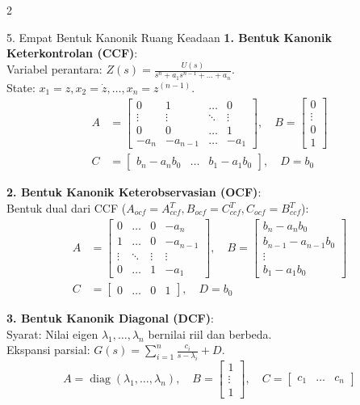 \documentclass[10pt,a4paper]{article}
\begin{document}
\begin{multicols*}{2}
\begin{rumusbox}{5. Empat Bentuk Kanonik Ruang Keadaan}
\textbf{1. Bentuk Kanonik Keterkontrolan (CCF)}:\\
Variabel perantara: $Z(s) = \frac{U(s)}{s^n + a_1 s^{n-1} + \dots + a_n}$.\\
State: $x_1 = z, x_2 = \dot{z}, \dots, x_n = z^{(n-1)}$.
{\scriptsize
\begin{align*}
A &= \begin{bmatrix} 0 & 1 & \dots & 0 \\ \vdots & \vdots & \ddots & \vdots \\ 0 & 0 & \dots & 1 \\ -a_n & -a_{n-1} & \dots & -a_1 \end{bmatrix}, \quad B = \begin{bmatrix} 0 \\ \vdots \\ 0 \\ 1 \end{bmatrix} \\
C &= \begin{bmatrix} b_n - a_n b_0 & \dots & b_1 - a_1 b_0 \end{bmatrix}, \quad D = b_0
\end{align*}
}

\textbf{2. Bentuk Kanonik Keterobservasian (OCF)}:\\
Bentuk dual dari CCF ($A_{ocf} = A_{ccf}^T, B_{ocf} = C_{ccf}^T, C_{ocf} = B_{ccf}^T$):
{\scriptsize
\begin{align*}
A &= \begin{bmatrix} 0 & \dots & 0 & -a_n \\ 1 & \dots & 0 & -a_{n-1} \\ \vdots & \ddots & \vdots & \vdots \\ 0 & \dots & 1 & -a_1 \end{bmatrix}, \quad B = \begin{bmatrix} b_n - a_n b_0 \\ b_{n-1} - a_{n-1} b_0 \\ \vdots \\ b_1 - a_1 b_0 \end{bmatrix} \\
C &= \begin{bmatrix} 0 & \dots & 0 & 1 \end{bmatrix}, \quad D = b_0
\end{align*}
}

\textbf{3. Bentuk Kanonik Diagonal (DCF)}:\\
Syarat: Nilai eigen $\lambda_1, \dots, \lambda_n$ bernilai riil dan berbeda.\\
Ekspansi parsial: $G(s) = \sum_{i=1}^n \frac{c_i}{s - \lambda_i} + D$.
{\scriptsize
$$A = \operatorname{diag}(\lambda_1, \dots, \lambda_n), \quad B = \begin{bmatrix} 1 \\ \vdots \\ 1 \end{bmatrix}, \quad C = \begin{bmatrix} c_1 & \dots & c_n \end{bmatrix}$$
}


\end{rumusbox}
\end{multicols*}
\end{document}
